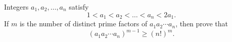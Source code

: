 Integers $a_1, a_2, \ldots, a_n$ satisfy
$$1<a_1<a_2<\ldots < a_n < 2a_1.$$If $m$ is the number of distinct prime factors of $a_1a_2\cdots a_n$, then prove that
$$(a_1a_2\cdots a_n)^{m-1}\geq (n!)^m.$$